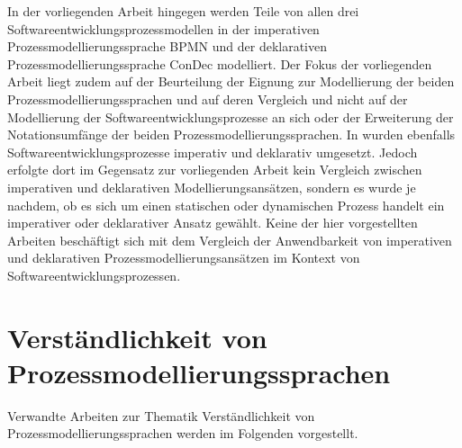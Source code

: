  In der vorliegenden Arbeit hingegen werden Teile von allen drei Softwareentwicklungsprozessmodellen in der imperativen Prozessmodellierungssprache BPMN und der deklarativen Prozessmodellierungssprache ConDec modelliert. Der Fokus der vorliegenden Arbeit liegt zudem auf der Beurteilung der Eignung zur Modellierung der beiden Prozessmodellierungssprachen und auf deren Vergleich und nicht auf der Modellierung der Softwareentwicklungsprozesse an sich oder der Erweiterung der Notationsumfänge der beiden Prozessmodellierungssprachen.\newline
 In \cite{sabrina795, sabrina734, sabrina758} wurden ebenfalls Softwareentwicklungsprozesse imperativ und deklarativ umgesetzt. Jedoch erfolgte dort im Gegensatz zur vorliegenden Arbeit kein Vergleich zwischen imperativen und deklarativen Modellierungsansätzen, sondern es wurde je nachdem, ob es sich um einen statischen oder dynamischen Prozess handelt ein imperativer oder deklarativer Ansatz gewählt.\newline
Keine der hier vorgestellten Arbeiten beschäftigt sich mit dem Vergleich der Anwendbarkeit von imperativen und deklarativen Prozessmodellierungsansätzen im Kontext von Softwareentwicklungsprozessen.


\section{Verständlichkeit von Prozessmodellierungssprachen}

Verwandte Arbeiten zur Thematik Verständlichkeit von Prozessmodellierungssprachen werden im Folgenden vorgestellt.

